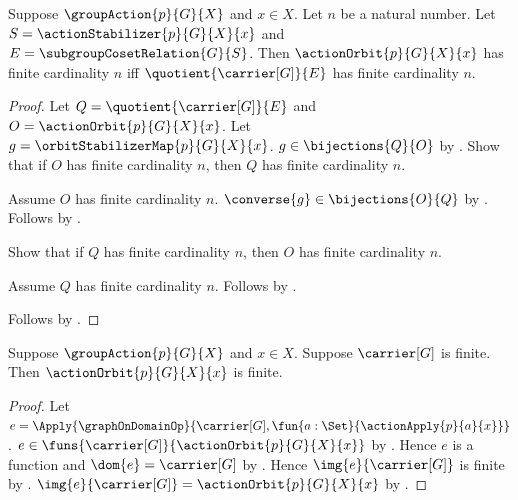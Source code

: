 \begin{theorem}\label{orbit_stabilizer_finite_cardinality_iff}
    Suppose $\groupAction{p}{G}{X}$ and $x\in X$.
    Let $n$ be a natural number.
    Let $S=\actionStabilizer{p}{G}{X}{x}$ and
        $E=\subgroupCosetRelation{G}{S}$.
    Then $\actionOrbit{p}{G}{X}{x}$ has finite cardinality $n$ iff
        $\quotient{\carrier[G]}{E}$ has finite cardinality $n$.
\end{theorem}
\begin{proof}
    Let $Q=\quotient{\carrier[G]}{E}$ and
        $O=\actionOrbit{p}{G}{X}{x}$.
    Let $g=\orbitStabilizerMap{p}{G}{X}{x}$.
    $g\in\bijections{Q}{O}$ by
        .
    Show that if $O$ has finite cardinality $n$, then
        $Q$ has finite cardinality $n$.
    \begin{subproof}
        Assume $O$ has finite cardinality $n$.
        $\converse{g}\in\bijections{O}{Q}$ by
            .
        Follows by .
    \end{subproof}
    Show that if $Q$ has finite cardinality $n$, then
        $O$ has finite cardinality $n$.
    \begin{subproof}
        Assume $Q$ has finite cardinality $n$.
        Follows by .
    \end{subproof}
    Follows by \auto.
\end{proof}

\begin{corollary}\label{finite_group_action_orbit_is_finite}
    Suppose $\groupAction{p}{G}{X}$ and $x\in X$.
    Suppose $\carrier[G]$ is finite.
    Then $\actionOrbit{p}{G}{X}{x}$ is finite.
\end{corollary}
\begin{proof}
    Let
        $e=\Apply{\graphOnDomainOp}{
            \carrier[G],\fun{a:\Set}{\actionApply{p}{a}{x}}}$.
    $e\in\funs{\carrier[G]}{\actionOrbit{p}{G}{X}{x}}$ by
        .
    Hence $e$ is a function and $\dom{e}=\carrier[G]$ by
        .
    Hence $\img{e}{\carrier[G]}$ is finite by
        .
    $\img{e}{\carrier[G]}=\actionOrbit{p}{G}{X}{x}$ by
        .
\end{proof}
